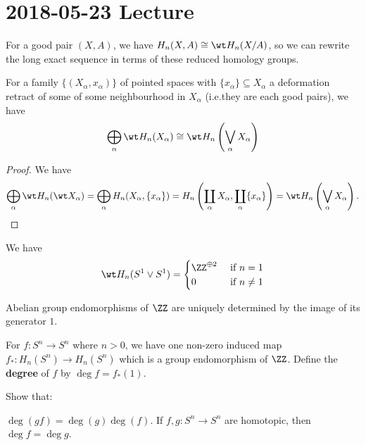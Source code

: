\section{2018-05-23 Lecture}

For a good pair $(X,A)$, we have $H_n(X,A) \cong \wt H_n(X/A)$, so we can rewrite the long exact sequence in terms of these reduced homology groups.

\begin{cor}
  For a family $\{(X_\alpha,x_\alpha)\}$ of pointed spaces with $\{x_\alpha\} \subseteq X_\alpha$ a deformation retract of some of some neighbourhood in $X_\alpha$ (i.e.\@ they are each good pairs), we have
  \[ \bigoplus_\alpha \wt H_n(X_\alpha) \cong \wt H_n\left(\bigvee_\alpha X_\alpha\right) \]
\end{cor}

\begin{proof}
  We have
  \[ \bigoplus_\alpha \wt H_n(\wt X_\alpha) = \bigoplus_\alpha H_n(X_\alpha,\{x_\alpha\}) = H_n \left( \coprod_\alpha X_\alpha, \coprod_\alpha \{x_\alpha\} \right) = \wt H_n \left( \bigvee_\alpha X_\alpha \right). \qedhere \]
\end{proof}

\begin{exam}
  We have
  \begin{equation*}
    \wt H_n(S^1 \vee S^1)=
    \begin{cases}
      \ZZ^{\oplus 2} & \text{ if } n=1 \\
      0 & \text{ if } n \neq 1
    \end{cases}
  \end{equation*}
\end{exam}

\begin{rmk}
  Abelian group endomorphisms of $\ZZ$ are uniquely determined by the image of its generator $1$.
\end{rmk}

\begin{defn}
  For $f: S^n \to S^n$ where $n>0$, we have one non-zero induced map $f_*: H_n(S^n) \to H_n(S^n)$ which is a group endomorphism of $\ZZ$.
  Define the \textbf{degree} of $f$ by $\deg f = f_*(1)$.
\end{defn}

\begin{exer}
  Show that:
  \begin{enum}
    \io $\deg (gf) = \deg(g)\deg(f)$.
    \io If $f,g: S^n \to S^n$ are homotopic, then $\deg f=\deg g$.
  \end{enum}
\end{exer}

